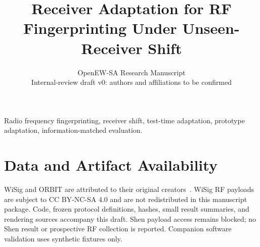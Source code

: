 \documentclass[journal]{IEEEtran}
\title{Receiver Adaptation for RF Fingerprinting Under Unseen-Receiver Shift}
\author{OpenEW-SA Research Manuscript\\Internal-review draft v0: authors and affiliations to be confirmed}
\begin{document}
\maketitle

\begin{IEEEkeywords}Radio frequency fingerprinting, receiver shift, test-time adaptation, prototype adaptation, information-matched evaluation.\end{IEEEkeywords}







\section*{Data and Artifact Availability}
WiSig and ORBIT are attributed to their original creators~\cite{wisig,orbit}. WiSig RF payloads are subject to CC BY-NC-SA 4.0 and are not redistributed in this manuscript package. Code, frozen protocol definitions, hashes, small result summaries, and rendering sources accompany this draft. Shen payload access remains blocked; no Shen result or prospective RF collection is reported. Companion software validation uses synthetic fixtures only.

\end{document}
